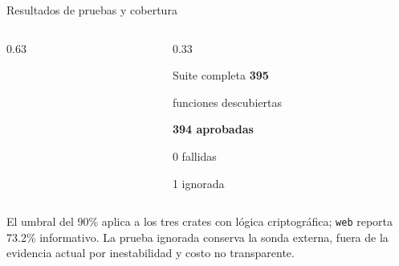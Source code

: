 \documentclass[aspectratio=169,11pt]{beamer}
\begin{document}
\begin{frame}{Resultados de pruebas y cobertura}
  \begin{columns}[T,onlytextwidth]
    \begin{column}{0.63\textwidth}
    \end{column}
    \begin{column}{0.33\textwidth}
      \begin{block}{Suite completa}
        \centering
        {\fontsize{28}{30}\selectfont\bfseries 395}\par
        {\small funciones descubiertas}\par
        \vspace{0.3cm}
        {\color{verde}\bfseries 394 aprobadas}\par
        {\color{tinta}0 fallidas}\par
        {\color{advertencia}1 ignorada}
      \end{block}
    \end{column}
  \end{columns}
  \vspace{0.2cm}
  {\scriptsize\color{gris}El umbral del 90\% aplica a los tres crates con lógica criptográfica; \texttt{web} reporta 73.2\% informativo. La prueba ignorada conserva la sonda externa, fuera de la evidencia actual por inestabilidad y costo no transparente.}
\end{frame}
\end{document}

